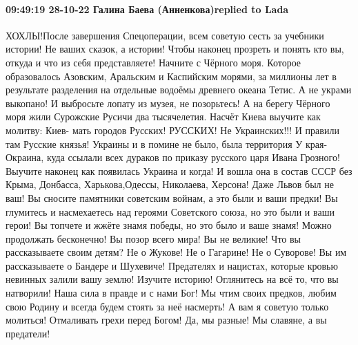  
 
 
 
 

\paragraph{09:49:19 28-10-22 Галина Баева (Анненкова)replied to Lada}

ХОХЛЫ!После завершения Спецоперации, всем советую сесть за учебники истории! Не ваших сказок, а истории! Чтобы наконец прозреть и понять кто вы, откуда и что из себя представляете! Начните с Чёрного моря. Которое образовалось Азовским, Аральским и Каспийским морями, за миллионы лет в результате разделения на отдельные водоёмы древнего океана Тетис. А не украми выкопано!
И выбросьте лопату из музея, не позорьтесь! А на берегу Чёрного моря жили Сурожские Русичи два тысячелетия.
Насчёт Киева выучите как молитву: Киев- мать городов Русских! РУССКИХ! Не Украинских!!! И правили там Русские князья! Украины и в помине не было, была территория
У края-Окраина, куда ссылали всех дураков по приказу русского царя Ивана Грозного!
Выучите наконец как появилась Украина и когда! И вошла она в состав СССР без Крыма, Донбасса, Харькова,Одессы, Николаева, Херсона! Даже Львов был не ваш! Вы сносите памятники советским войнам, а это были и ваши предки!
Вы глумитесь и насмехаетесь над героями Советского союза, но это были и ваши герои! Вы топчете и жжёте знамя победы, но это было и ваше знамя! Можно продолжать бесконечно!
Вы позор всего мира! Вы не великие! Что вы рассказываете своим детям? Не о Жукове! Не о Гагарине! Не о Суворове!
Вы им рассказываете о Бандере и Шухевиче! Предателях и нацистах, которые кровью невинных залили вашу землю!
Изучите историю! Оглянитесь на всё то, что вы натворили!
Наша сила в правде и с нами Бог! Мы чтим своих предков, любим свою Родину и всегда будем стоять за неё насмерть!
А вам я советую только молиться! Отмаливать грехи перед Богом! Да, мы разные!
Мы славяне, а вы предатели!
